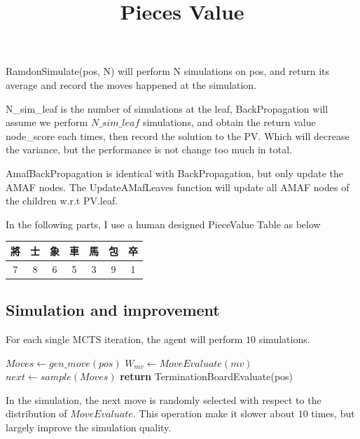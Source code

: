 \documentclass[a4paper, 12pt]{article}  %
\begin{document}
RamdonSimulate(pos, N) will perform N simulations on pos, and return its average and record the moves happened at the simulation.

N\_sim\_leaf is the number of simulations at the leaf, BackPropagation will assume we perform $N\_sim\_leaf$ simulations, and obtain the return value node\_score each times, then record the solution to the PV. Which will decrease the variance, but the performance is not change too much in total.

AmafBackPropagation is identical with BackPropagation, but only update the AMAF nodes. The UpdateAMafLeaves function will update all AMAF nodes of the children w.r.t PV.leaf.

In the following parts, I use a human designed PieceValue Table as below

\begin{table}[!h]
  \centering
  \begin{tabular}{|c|c|c|c|c|c|c|}
    將 & 士 & 象 & 車 & 馬 & 包 & 卒\\
    \hline
    7 & 8 & 6 & 5 & 3 & 9 & 1
  \end{tabular}

  \title{Pieces Value}
\end{table}

\subsection{Simulation and improvement}
For each single MCTS iteration, the agent will perform $10$ simulations.

\begin{algorithm}[!h]
  \begin{algorithmic}[1]
        \State$Moves\gets gen\_move(pos)$
          \State$W_{mv}\gets MoveEvaluate(mv)$
        \EndFor
        \State $next\gets sample(Moves)$ 
      \EndWhile
      \State \textbf{return} TerminationBoardEvaluate(pos)
    \EndProcedure
  \end{algorithmic}
\end{algorithm}


In the simulation, the next move is randomly selected with respect to the distribution of $MoveEvaluate$. This operation make it slower about $10$ times, but largely improve the simulation quality.
\end{document}
